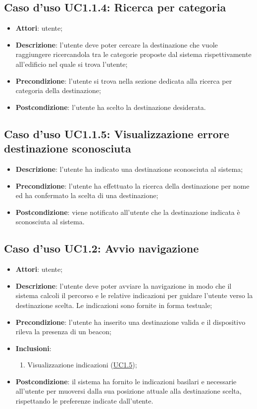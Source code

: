 \documentclass[../AnalisiDeiRequisiti.tex]{subfiles}
\begin{document}
\subsection{Caso d'uso UC1.1.4: Ricerca per categoria}
\begin{itemize}
\item \textbf{Attori}: utente;
\item \textbf{Descrizione}: l'utente deve poter cercare la destinazione che vuole raggiungere ricercandola tra le categorie proposte dal sistema rispettivamente all'edificio nel quale si trova l'utente; 
      \item \textbf{Precondizione}: l'utente si trova nella sezione dedicata alla ricerca per categoria della destinazione;
    \item \textbf{Postcondizione}: l'utente ha scelto la destinazione desiderata.
  \end{itemize}
\hypertarget{UC1.1.5}{}
\subsection{Caso d'uso UC1.1.5: Visualizzazione errore destinazione sconosciuta}
\begin{itemize}
\item \textbf{Descrizione}: l'utente ha indicato una destinazione sconosciuta al sistema; 
      \item \textbf{Precondizione}: l'utente ha effettuato la ricerca della destinazione per nome ed ha confermato la scelta di una destinazione;
    \item \textbf{Postcondizione}: viene notificato all'utente che la destinazione indicata è sconosciuta al sistema.
  \end{itemize}
\hypertarget{UC1.2}{}
\subsection{Caso d'uso UC1.2: Avvio navigazione}
\begin{itemize}
\item \textbf{Attori}: utente;
\item \textbf{Descrizione}: l'utente deve poter avviare la navigazione in modo che il sistema calcoli il percorso e le relative indicazioni per guidare l'utente verso la destinazione scelta. Le indicazioni sono fornite in forma testuale; 
      \item \textbf{Precondizione}: l'utente ha inserito una destinazione valida e il dispositivo rileva la presenza di un beacon\g;
    \item \textbf{Inclusioni}:
      \begin{enumerate}
          \item Visualizzazione indicazioni (\hyperlink{UC1.5}{UC1.5});

      \end{enumerate}
    \item \textbf{Postcondizione}: il sistema ha fornito le indicazioni basilari  e necessarie all'utente per muoversi dalla sua posizione attuale alla destinazione scelta, rispettando le preferenze indicate dall'utente.
  \end{itemize}
\hypertarget{UC1.3}{}
\end{document}
